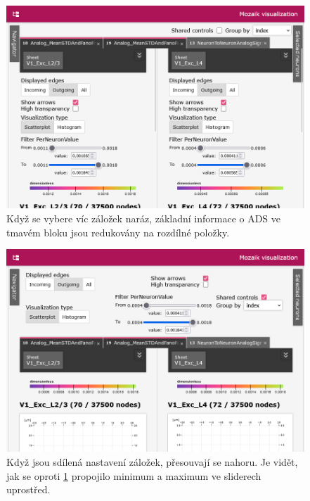 \begin{figure}
	\centering
	\includegraphics[width=1\linewidth]{img/screenshot_multiple_tabs.png}
	\caption{Když se vybere víc záložek naráz, základní informace o ADS ve tmavém bloku jsou redukovány na rozdílné položky.}
	\label{fig:multiple_tabs}
\end{figure}

\begin{figure}
	\centering
	\includegraphics[width=1\linewidth]{img/screenshot_shared_controls.png}
	\caption{Když jsou sdílená nastavení záložek, přesouvají se nahoru. Je vidět, jak se oproti \ref{fig:multiple_tabs} propojilo minimum a maximum ve sliderech uprostřed.}
	\label{fig:shared_controls}
\end{figure}

